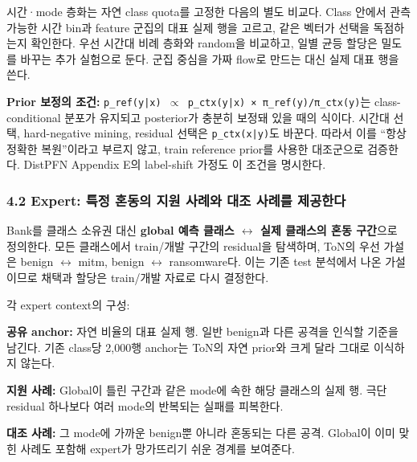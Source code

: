 시간·mode 층화는 자연 class quota를 고정한 다음의 별도 비교다. Class 안에서 관측 가능한 시간 bin과 feature 군집의 대표 실제 행을 고르고, 같은 벡터가 선택을 독점하는지 확인한다. 우선 시간대 비례 층화와 random을 비교하고, 일별 균등 할당은 밀도를 바꾸는 추가 실험으로 둔다. 군집 중심을 가짜 flow로 만드는 대신 실제 대표 행을 쓴다.

\textbf{Prior 보정의 조건:} \texttt{p\_\allowbreak{}\allowbreak{}ref(y|\allowbreak{}x) \ensuremath{\propto} p\_\allowbreak{}\allowbreak{}c\allowbreak{}tx(y|x) \allowbreak{}× π\_\allowbreak{}\allowbreak{}ref(\allowbreak{}y)/\allowbreak{}\allowbreak{}π\_\allowbreak{}\allowbreak{}ctx\allowbreak{}(y)}는 class-conditional 분포가 유지되고 posterior가 충분히 보정돼 있을 때의 식이다. 시간대 선택, hard-negative mining, residual 선택은 \texttt{p\_\allowbreak{}\allowbreak{}ctx(x|\allowbreak{}y)}도 바꾼다. 따라서 이를 “항상 정확한 복원”이라고 부르지 않고, train reference prior를 사용한 대조군으로 검증한다. DistPFN Appendix E의 label-shift 가정도 이 조건을 명시한다.

\subsubsection{4.2 Expert: 특정 혼동의 지원 사례와 대조 사례를 제공한다}
Bank를 클래스 소유권 대신 \textbf{global 예측 클래스  \ensuremath{\leftrightarrow}  실제 클래스의 혼동 구간}으로 정의한다. 모든 클래스에서 train/\allowbreak{}개발 구간의 residual을 탐색하며, ToN의 우선 가설은 benign \ensuremath{\leftrightarrow} mitm, benign \ensuremath{\leftrightarrow} ransomware다. 이는 기존 test 분석에서 나온 가설이므로 채택과 할당은 train/\allowbreak{}개발 자료로 다시 결정한다.

각 expert context의 구성:

\par\noindent \textbullet\enspace \textbf{공유 anchor:} 자연 비율의 대표 실제 행. 일반 benign과 다른 공격을 인식할 기준을 남긴다. 기존 class당 2,000행 anchor는 ToN의 자연 prior와 크게 달라 그대로 이식하지 않는다.


\par\noindent \textbullet\enspace \textbf{지원 사례:} Global이 틀린 구간과 같은 mode에 속한 해당 클래스의 실제 행. 극단 residual 하나보다 여러 mode의 반복되는 실패를 피복한다.


\par\noindent \textbullet\enspace \textbf{대조 사례:} 그 mode에 가까운 benign뿐 아니라 혼동되는 다른 공격. Global이 이미 맞힌 사례도 포함해 expert가 망가뜨리기 쉬운 경계를 보여준다.


